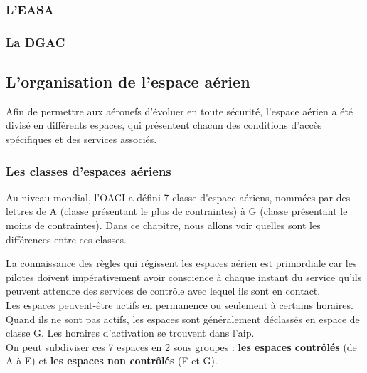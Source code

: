 		\subsubsection{L'EASA}
		
		\subsubsection{La DGAC}
		
			
	
	\subsection{L'organisation de l'espace aérien}
	Afin de permettre aux aéronefs d'évoluer en toute sécurité, l'espace aérien a été divisé en différents espaces, qui présentent chacun des conditions d'accès spécifiques et des services associés.
		
		\subsubsection{Les classes d'espaces aériens}
		Au niveau mondial, l'OACI a défini 7 \glspl{classe d'espace aérien}, nommées par des lettres de A (classe présentant le plus de contraintes) à G (classe présentant le moins de contraintes). Dans ce chapitre, nous allons voir quelles sont les différences entre ces classes.
		
		La connaissance des règles qui régissent les espaces aérien est primordiale car les pilotes doivent impérativement avoir conscience à chaque instant du service qu'ils peuvent attendre des services de contrôle avec lequel ils sont en contact.\\
		
		Les espaces peuvent-être actifs en permanence ou seulement à certains horaires. Quand ils ne sont pas actifs, les espaces sont généralement déclassés en espace de classe G. Les horaires d'activation se trouvent dans l'\acrshort{aip}. \\
		
		On peut subdiviser ces 7 espaces en 2 sous groupes : \textbf{les espaces contrôlés} (de A à E) et \textbf{les espaces non contrôlés} (F et G). \\
		
